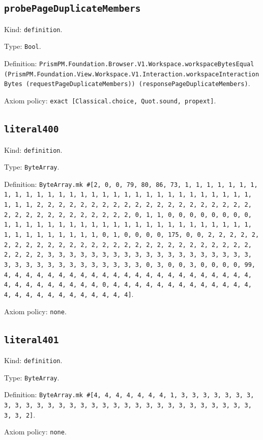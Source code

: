 \documentclass[11pt]{article}
\begin{document}
\subsection*{\texttt{probePageDuplicateMembers}}
\noindent Kind: \texttt{definition}.\par
\noindent Type: \texttt{Bool}.\par
\noindent Definition: \texttt{PrismPM.Foundation.Browser.V1.Workspace.workspaceBytesEqual (PrismPM.Foundation.View.Workspace.V1.Interaction.workspaceInteractionBytes (requestPageDuplicateMembers)) (responsePageDuplicateMembers)}.\par
\noindent Axiom policy: \texttt{exact [Classical.choice, Quot.sound, propext]}.\par
\subsection*{\texttt{literal400}}
\noindent Kind: \texttt{definition}.\par
\noindent Type: \texttt{ByteArray}.\par
\noindent Definition: \texttt{ByteArray.mk \#[2, 0, 0, 79, 80, 86, 73, 1, 1, 1, 1, 1, 1, 1, 1, 1, 1, 1, 1, 1, 1, 1, 1, 1, 1, 1, 1, 1, 1, 1, 1, 1, 1, 1, 1, 1, 1, 1, 1, 1, 2, 2, 2, 2, 2, 2, 2, 2, 2, 2, 2, 2, 2, 2, 2, 2, 2, 2, 2, 2, 2, 2, 2, 2, 2, 2, 2, 2, 2, 2, 2, 2, 0, 1, 1, 0, 0, 0, 0, 0, 0, 0, 0, 1, 1, 1, 1, 1, 1, 1, 1, 1, 1, 1, 1, 1, 1, 1, 1, 1, 1, 1, 1, 1, 1, 1, 1, 1, 1, 1, 1, 1, 1, 1, 1, 0, 1, 0, 0, 0, 0, 175, 0, 0, 2, 2, 2, 2, 2, 2, 2, 2, 2, 2, 2, 2, 2, 2, 2, 2, 2, 2, 2, 2, 2, 2, 2, 2, 2, 2, 2, 2, 2, 2, 2, 2, 3, 3, 3, 3, 3, 3, 3, 3, 3, 3, 3, 3, 3, 3, 3, 3, 3, 3, 3, 3, 3, 3, 3, 3, 3, 3, 3, 3, 3, 3, 3, 3, 0, 3, 0, 0, 3, 0, 0, 0, 0, 99, 4, 4, 4, 4, 4, 4, 4, 4, 4, 4, 4, 4, 4, 4, 4, 4, 4, 4, 4, 4, 4, 4, 4, 4, 4, 4, 4, 4, 4, 4, 4, 4, 0, 4, 4, 4, 4, 4, 4, 4, 4, 4, 4, 4, 4, 4, 4, 4, 4, 4, 4, 4, 4, 4, 4, 4, 4, 4]}.\par
\noindent Axiom policy: \texttt{none}.\par
\subsection*{\texttt{literal401}}
\noindent Kind: \texttt{definition}.\par
\noindent Type: \texttt{ByteArray}.\par
\noindent Definition: \texttt{ByteArray.mk \#[4, 4, 4, 4, 4, 4, 4, 1, 3, 3, 3, 3, 3, 3, 3, 3, 3, 3, 3, 3, 3, 3, 3, 3, 3, 3, 3, 3, 3, 3, 3, 3, 3, 3, 3, 3, 3, 3, 3, 3, 2]}.\par
\noindent Axiom policy: \texttt{none}.\par
\end{document}
